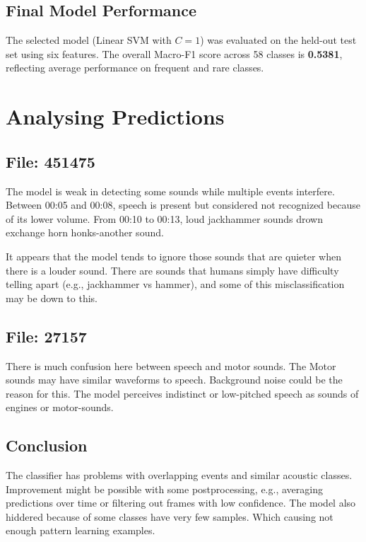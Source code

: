 \documentclass{article}
\begin{document}
\subsection{Final Model Performance}
The selected model (Linear SVM with $C=1$) was evaluated on the held-out test set using six features.
The overall Macro-F1 score across 58 classes is \textbf{0.5381}, reflecting average performance on frequent and rare classes.

\section{Analysing Predictions}

\subsection{File: 451475}
The model is weak in detecting some sounds while multiple events interfere. Between 00:05 and 00:08, speech is present but considered not recognized because of its lower volume. From 00:10 to 00:13, loud jackhammer sounds drown exchange horn honks-another sound.

It appears that the model tends to ignore those sounds that are quieter when there is a louder sound. There are sounds that humans simply have difficulty telling apart (e.g., jackhammer vs hammer), and some of this misclassification may be down to this.

\subsection{File: 27157}
There is much confusion here between speech and motor sounds. The Motor sounds may have similar waveforms to speech. Background noise could be the reason for this. The model perceives indistinct or low-pitched speech as sounds of engines or motor-sounds.

\subsection{Conclusion}
The classifier has problems with overlapping events and similar acoustic classes. Improvement might be possible with some postprocessing, e.g., averaging predictions over time or filtering out frames with low confidence. The model also hiddered because of some classes have very few samples. Which causing not enough pattern learning examples.
\end{document}
